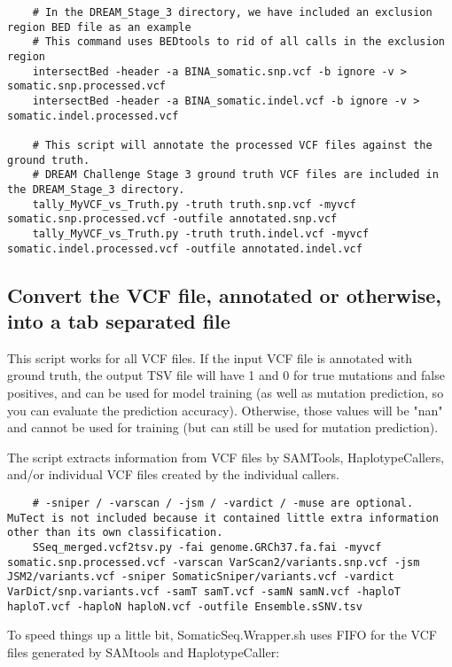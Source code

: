 \documentclass[10pt,letterpaper]{article}
\begin{document}
	\begin{lstlisting}
	# In the DREAM_Stage_3 directory, we have included an exclusion region BED file as an example
	# This command uses BEDtools to rid of all calls in the exclusion region
	intersectBed -header -a BINA_somatic.snp.vcf -b ignore -v > somatic.snp.processed.vcf
	intersectBed -header -a BINA_somatic.indel.vcf -b ignore -v > somatic.indel.processed.vcf
	
	# This script will annotate the processed VCF files against the ground truth.
	# DREAM Challenge Stage 3 ground truth VCF files are included in the DREAM_Stage_3 directory.
	tally_MyVCF_vs_Truth.py -truth truth.snp.vcf -myvcf somatic.snp.processed.vcf -outfile annotated.snp.vcf
	tally_MyVCF_vs_Truth.py -truth truth.indel.vcf -myvcf somatic.indel.processed.vcf -outfile annotated.indel.vcf
	\end{lstlisting}



	\subsection{Convert the VCF file, annotated or otherwise, into a tab separated file}
	This script works for all VCF files. If the input VCF file is annotated with ground truth, the output TSV file will have 1 and 0 for true mutations and false positives, and can be used for model training (as well as mutation prediction, so you can evaluate the prediction accuracy). Otherwise, those values will be "nan" and cannot be used for training (but can still be used for mutation prediction). 
	
	The script extracts information from VCF files by SAMTools, HaplotypeCallers, and/or individual VCF files created by the individual callers. 
	
	
	\begin{lstlisting}
	# -sniper / -varscan / -jsm / -vardict / -muse are optional. MuTect is not included because it contained little extra information other than its own classification.
	SSeq_merged.vcf2tsv.py -fai genome.GRCh37.fa.fai -myvcf somatic.snp.processed.vcf -varscan VarScan2/variants.snp.vcf -jsm JSM2/variants.vcf -sniper SomaticSniper/variants.vcf -vardict VarDict/snp.variants.vcf -samT samT.vcf -samN samN.vcf -haploT haploT.vcf -haploN haploN.vcf -outfile Ensemble.sSNV.tsv
	\end{lstlisting}
	
	To speed things up a little bit, SomaticSeq.Wrapper.sh uses FIFO for the VCF files generated by SAMtools and HaplotypeCaller:
	
\end{document}
